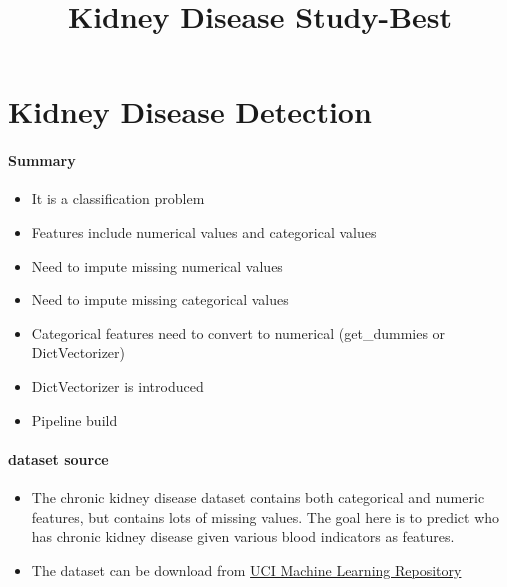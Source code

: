 \documentclass[11pt]{article}
\title{Kidney Disease Study-Best}
\providecommand{\tightlist}{%
      \setlength{\itemsep}{0pt}\setlength{\parskip}{0pt}}
\begin{document}
    
    
    \maketitle
    
    

    
    \hypertarget{kidney-disease-detection}{%
\section{Kidney Disease Detection}\label{kidney-disease-detection}}

    \hypertarget{summary}{%
\paragraph{Summary}\label{summary}}

\begin{itemize}
\tightlist
\item
  It is a classification problem
\item
  Features include numerical values and categorical values
\item
  Need to impute missing numerical values
\item
  Need to impute missing categorical values
\item
  Categorical features need to convert to numerical (get\_dummies or
  DictVectorizer)
\item
  DictVectorizer is introduced
\item
  Pipeline build
\end{itemize}

    \hypertarget{dataset-source}{%
\paragraph{dataset source}\label{dataset-source}}

\begin{itemize}
\tightlist
\item
  The chronic kidney disease dataset contains both categorical and
  numeric features, but contains lots of missing values. The goal here
  is to predict who has chronic kidney disease given various blood
  indicators as features.
\item
  The dataset can be download from
  \href{https://archive.ics.uci.edu/ml/datasets/chronic_kidney_disease}{UCI
  Machine Learning Repository}
\end{itemize}
\end{document}
